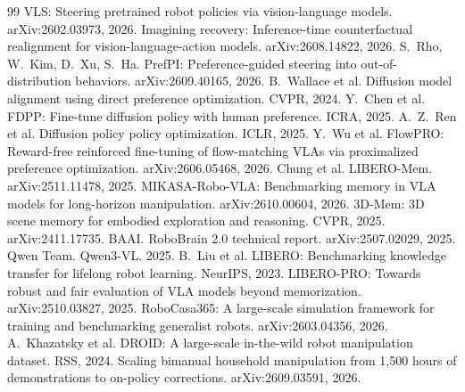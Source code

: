 \documentclass[10pt,a4paper]{article}
\begin{document}
\begin{thebibliography}{99}
 VLS: Steering pretrained robot policies via vision-language models. arXiv:2602.03973, 2026.
 Imagining recovery: Inference-time counterfactual realignment for vision-language-action models. arXiv:2608.14822, 2026.
 S.~Rho, W.~Kim, D.~Xu, S.~Ha. PrefPI: Preference-guided steering into out-of-distribution behaviors. arXiv:2609.40165, 2026.
 B.~Wallace et al. Diffusion model alignment using direct preference optimization. CVPR, 2024.
 Y.~Chen et al. FDPP: Fine-tune diffusion policy with human preference. ICRA, 2025.
 A.~Z.~Ren et al. Diffusion policy policy optimization. ICLR, 2025.
 Y.~Wu et al. FlowPRO: Reward-free reinforced fine-tuning of flow-matching VLAs via proximalized preference optimization. arXiv:2606.05468, 2026.
 Chung et al. LIBERO-Mem. arXiv:2511.11478, 2025.
 MIKASA-Robo-VLA: Benchmarking memory in VLA models for long-horizon manipulation. arXiv:2610.00604, 2026.
 3D-Mem: 3D scene memory for embodied exploration and reasoning. CVPR, 2025. arXiv:2411.17735.
 BAAI. RoboBrain 2.0 technical report. arXiv:2507.02029, 2025.
 Qwen Team. Qwen3-VL. 2025.
 B.~Liu et al. LIBERO: Benchmarking knowledge transfer for lifelong robot learning. NeurIPS, 2023.
 LIBERO-PRO: Towards robust and fair evaluation of VLA models beyond memorization. arXiv:2510.03827, 2025.
 RoboCasa365: A large-scale simulation framework for training and benchmarking generalist robots. arXiv:2603.04356, 2026.
 A.~Khazatsky et al. DROID: A large-scale in-the-wild robot manipulation dataset. RSS, 2024.
 Scaling bimanual household manipulation from 1,500 hours of demonstrations to on-policy corrections. arXiv:2609.03591, 2026.
\end{thebibliography}
\end{document}
